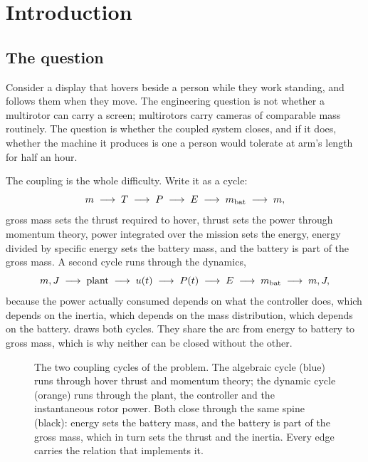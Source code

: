 ﻿\section{Introduction}
\label{sec:intro}

\subsection{The question}

Consider a display that hovers beside a person while they work standing, and
follows them when they move. The engineering question is not whether a
multirotor can carry a screen; multirotors carry cameras of comparable mass
routinely. The question is whether the coupled system closes, and if it does,
whether the machine it produces is one a person would tolerate at arm's length
for half an hour.

The coupling is the whole difficulty. Write it as a cycle:
\begin{equation}
  m \;\longrightarrow\; T \;\longrightarrow\; P \;\longrightarrow\; E
    \;\longrightarrow\; m_{\mathrm{bat}} \;\longrightarrow\; m ,
  \label{eq:cycle}
\end{equation}
gross mass sets the thrust required to hover, thrust sets the power through
momentum theory, power integrated over the mission sets the energy, energy
divided by specific energy sets the battery mass, and the battery is part of
the gross mass. A second cycle runs through the dynamics,
\begin{equation}
  m, J \;\longrightarrow\; \text{plant} \;\longrightarrow\; u(t)
    \;\longrightarrow\; P(t) \;\longrightarrow\; E \;\longrightarrow\; m_{\mathrm{bat}}
    \;\longrightarrow\; m, J ,
  \label{eq:cycle2}
\end{equation}
because the power actually consumed depends on what the controller does, which
depends on the inertia, which depends on the mass distribution, which depends
on the battery.  draws both cycles. They share the arc from
energy to battery to gross mass, which is why neither can be closed without the
other.

\begin{figure}[hbp]
\centering

\caption{The two coupling cycles of the problem. The algebraic cycle
 (blue) runs through hover thrust and momentum theory; the
dynamic cycle  (orange) runs through the plant, the
controller and the instantaneous rotor power. Both close through the same spine
(black): energy sets the battery mass, and the battery is part of the gross
mass, which in turn sets the thrust and the inertia. Every edge carries the
relation that implements it.}
\label{fig:cycles}
\end{figure}

